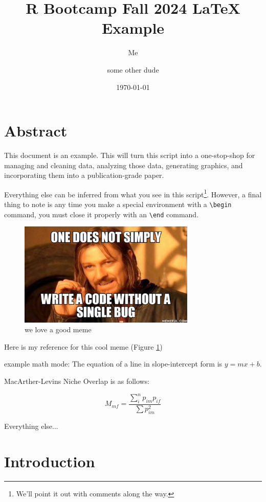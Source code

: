 \documentclass{article}\usepackage[]{graphicx}\usepackage[]{xcolor}
\title{R Bootcamp Fall 2024 LaTeX Example}
\author{Me \and some other dude}
\date{\today}
\begin{document}
\maketitle

\section*{Abstract}
This document is an example. This will turn this script into a one-stop-shop for managing and cleaning data, analyzing those data, generating graphics, and incorporating them into a publication-grade paper.

\noindent Everything else can be inferred from what you see in this script\footnote{We'll point it out with comments along the way.}. However, a final thing to note is any time you make a special environment with a \texttt{\textbackslash begin{}} command, you must close it properly with an \texttt{\textbackslash end{}} command.

\begin{figure}[h]
    \centering
    \includegraphics[width=0.75\textwidth]{figure/meme.jpeg}
    \caption{we love a good meme}
    \label{fig:meme}
\end{figure}

Here is my reference for this cool meme (Figure \ref{fig:meme})


example math mode: 
The equation of a line in slope-intercept form is $y=mx+b$.


MacArther-Levins Niche Overlap is as follows:

\begin{equation}
  \label{eqn:1}
  M_{mf} = \frac{\sum_{i}^{n} p_{im} p_{if}}{\sum p^2_{im}}
\end{equation}

\noindent Everything else...

\newpage
\section*{Introduction}
\end{document}
